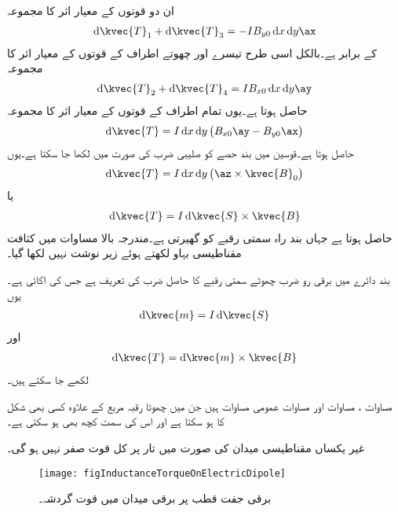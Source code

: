 ان دو قوتوں کے معیار اثر کا مجموعہ
\begin{align*}
\dif \kvec{T}_1+\dif \kvec{T}_3=-IB_{y0}\dif x \dif y\ax
\end{align*}
کے برابر ہے۔بالکل اسی طرح تیسرے اور چھوتے اطراف کے قوتوں کے معیار اثر کا مجموعہ
\begin{align*}
\dif \kvec{T}_2+\dif \kvec{T}_4=IB_{x0}\dif x \dif y\ay
\end{align*}
حاصل ہوتا ہے۔یوں تمام اطراف کے قوتوں کے معیار اثر کا مجموعہ
\begin{align*}
\dif \kvec{T}=I \dif x \dif y \left(B_{x0}\ay-B_{y0}\ax \right)
\end{align*}
حاصل ہوتا ہے۔قوسین میں بند حصے کو صلیبی ضرب کی صورت میں لکھا جا سکتا ہے۔یوں
\begin{align*}
\dif \kvec{T}=I \dif x \dif y \left(\az \times \kvec{B}_0 \right)
\end{align*}
یا
\begin{align}\label{مساوات_امالہ_تفرقی_مروڑ_عمومی}
\dif \kvec{T}=I \dif \kvec{S} \times \kvec{B}
\end{align}
حاصل ہوتا ہے جہاں بند راہ سمتی رقبے  کو گھیرتی ہے۔مندرجہ بالا مساوات میں کثافت مقناطیسی بہاو  لکھتے ہوئے زیر نوشت نہیں لکھا گیا۔

بند دائرے میں برقی رو ضرب چھوٹے سمتی رقبے  کا حاصل ضرب   کی تعریف ہے جس کی اکائی  ہے۔یوں
\begin{align}\label{مساوات-امالہ_مقناطیسی_جفت_قطب_معیار_اثر}
\dif \kvec{m}=I \dif \kvec{S}
\end{align}
اور
\begin{align}\label{مساوات_امالہ_تفرقی_مروڑ}
\dif \kvec{T} =\dif \kvec{m} \times \kvec{B}
\end{align}
لکھے جا سکتے ہیں۔

مساوات ، مساوات  اور مساوات  عمومی مساوات ہیں جن میں چھوٹا رقبہ  مربع کے علاوہ کسی بھی شکل کا ہو سکتا ہے اور اس کی سمت کچھ بھی ہو سکتی ہے۔

غیر یکساں مقناطیسی میدان کی صورت میں تار پر کل قوت صفر نہیں ہو گی۔

\begin{figure}
\centering
\texttt{[image: figInductanceTorqueOnElectricDipole]}
\caption{برقی جفت قطب پر برقی میدان میں قوت گردشہ۔}
\label{شکل_امالہ_برقی_جفت_قطب_مروڑ}
\end{figure}

